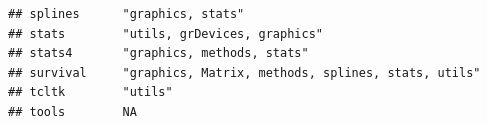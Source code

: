 \documentclass[]{article}
\begin{document}
\begin{verbatim}
## splines      "graphics, stats"                                                                                                                                                                                                                                                                                                                                                                                                                                                                     
## stats        "utils, grDevices, graphics"                                                                                                                                                                                                                                                                                                                                                                                                                                                          
## stats4       "graphics, methods, stats"                                                                                                                                                                                                                                                                                                                                                                                                                                                            
## survival     "graphics, Matrix, methods, splines, stats, utils"                                                                                                                                                                                                                                                                                                                                                                                                                                    
## tcltk        "utils"                                                                                                                                                                                                                                                                                                                                                                                                                                                                               
## tools        NA                                                                                                                                                                                                                                                                                                                                                                                                                                                                                    

\end{verbatim}
\end{document}
